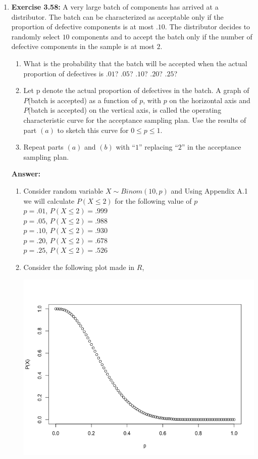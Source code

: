 \documentclass[12pt]{article}
\theoremstyle{homework}
\begin{document}
\begin{enumerate}
\item\hspace{.5in}\textbf{Exercise 3.58:} A very large batch of components has arrived at a distributor. The batch can be characterized as acceptable only if the proportion of defective components is at most $.10$. The distributor decides to randomly select $10$ components and to accept the batch only if the number of defective components in the sample is at most $2$.
\begin{enumerate}
\item What is the probability that the batch will be accepted when the actual proportion of defectives is $.01$? $.05$? $.10$? $.20$? $.25$?
\item Let p denote the actual proportion of defectives in the batch. A graph of $P$(batch is accepted) as a function of $p$, with $p$ on the horizontal axis and $P$(batch is accepted) on the vertical axis, is called the operating characteristic curve for the acceptance sampling plan. Use the results of part $(a)$ to sketch this curve for $0 \le p \le 1$.
\item Repeat parts $(a)$ and $(b)$ with “$1$” replacing “$2$” in the acceptance sampling plan.
\end{enumerate}
\textbf{Answer:} 
\begin{enumerate}
\item Consider random variable $X\sim Binom(10,p)$ and Using Appendix A.1 we will calculate $P(X \le 2)$ for the following value of $p$\\

$ p = .01$, $P(X\le 2)=.999$\\
$ p = .05$, $P(X\le 2)=.988$\\
$ p = .10$, $P(X\le 2)=.930$\\
$ p = .20$, $P(X\le 2)=.678$\\
$ p = .25$, $P(X\le 2)=.526$\\
\item Consider the following plot made in $R$,
\begin{center}
  \includegraphics[width = \textwidth]{Rplot.png}
\end{center}




\end{enumerate}
\end{enumerate}
\end{document}
